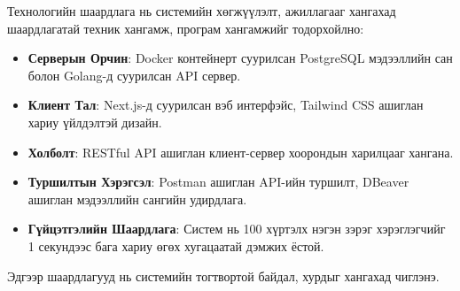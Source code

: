 
Технологийн шаардлага нь системийн хөгжүүлэлт, ажиллагааг хангахад шаардлагатай техник хангамж, програм хангамжийг тодорхойлно:
\begin{itemize}
    \item \textbf{Серверын Орчин}: Docker контейнерт суурилсан PostgreSQL мэдээллийн сан болон Golang-д суурилсан API сервер.
    \item \textbf{Клиент Тал}: Next.js-д суурилсан вэб интерфэйс, Tailwind CSS ашиглан хариу үйлдэлтэй дизайн.
    \item \textbf{Холболт}: RESTful API ашиглан клиент-сервер хоорондын харилцааг хангана.
    \item \textbf{Туршилтын Хэрэгсэл}: Postman ашиглан API-ийн туршилт, DBeaver ашиглан мэдээллийн сангийн удирдлага.
    \item \textbf{Гүйцэтгэлийн Шаардлага}: Систем нь 100 хүртэлх нэгэн зэрэг хэрэглэгчийг 1 секундээс бага хариу өгөх хугацаатай дэмжих ёстой.
\end{itemize}
Эдгээр шаардлагууд нь системийн тогтвортой байдал, хурдыг хангахад чиглэнэ.
